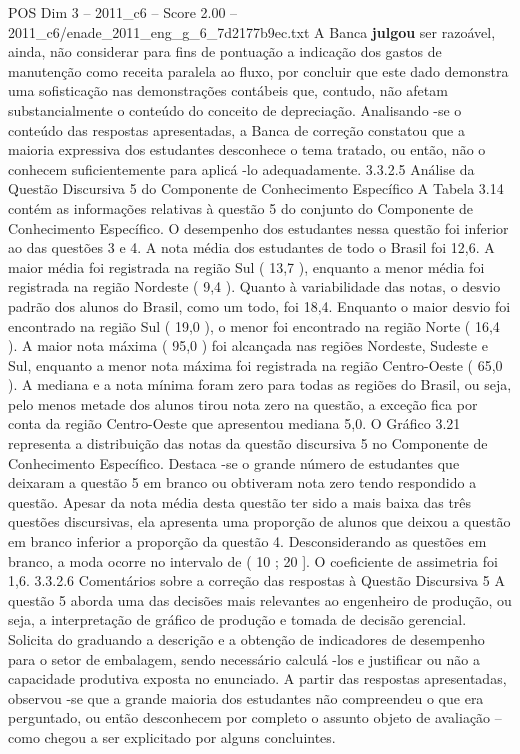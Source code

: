 \begin{textsample}{POS Dim 3 – 2011\_c6 – Score 2.00 – 2011\_c6/enade\_2011\_eng\_g\_6\_7d2177b9ec.txt}
A Banca \textbf{julgou} ser razoável, ainda, não considerar para fins de pontuação a indicação dos gastos de manutenção como receita paralela ao fluxo, por concluir que este dado demonstra uma sofisticação nas demonstrações contábeis que, contudo, não afetam substancialmente o conteúdo do conceito de depreciação.
Analisando -se o conteúdo das respostas apresentadas, a Banca de correção constatou que a maioria expressiva dos estudantes desconhece o tema tratado, ou então, não o conhecem suficientemente para aplicá -lo adequadamente. 3.3.2.5 Análise da Questão Discursiva 5 do Componente de Conhecimento Específico A Tabela 3.14 contém as informações relativas à questão 5 do conjunto do Componente de Conhecimento Específico.
O desempenho dos estudantes nessa questão foi inferior ao das questões 3 e 4.
A nota média dos estudantes de todo o Brasil foi 12,6.
A maior média foi registrada na região Sul ( 13,7 ), enquanto a menor média foi registrada na região Nordeste ( 9,4 ).
Quanto à variabilidade das notas, o desvio padrão dos alunos do Brasil, como um todo, foi 18,4.
Enquanto o maior desvio foi encontrado na região Sul ( 19,0 ), o menor foi encontrado na região Norte ( 16,4 ).
A maior nota máxima ( 95,0 ) foi alcançada nas regiões Nordeste, Sudeste e Sul, enquanto a menor nota máxima foi registrada na região Centro-Oeste ( 65,0 ).
A mediana e a nota mínima foram zero para todas as regiões do Brasil, ou seja, pelo menos metade dos alunos tirou nota zero na questão, a exceção fica por conta da região Centro-Oeste que apresentou mediana 5,0.
O Gráfico 3.21 representa a distribuição das notas da questão discursiva 5 no Componente de Conhecimento Específico.
Destaca -se o grande número de estudantes que deixaram a questão 5 em branco ou obtiveram nota zero tendo respondido a questão.
Apesar da nota média desta questão ter sido a mais baixa das três questões discursivas, ela apresenta uma proporção de alunos que deixou a questão em branco inferior a proporção da questão 4.
Desconsiderando as questões em branco, a moda ocorre no intervalo de ( 10 ; 20 ].
O coeficiente de assimetria foi 1,6. 3.3.2.6 Comentários sobre a correção das respostas à Questão Discursiva 5 A questão 5 aborda uma das decisões mais relevantes ao engenheiro de produção, ou seja, a interpretação de gráfico de produção e tomada de decisão gerencial.
Solicita do graduando a descrição e a obtenção de indicadores de desempenho para o setor de embalagem, sendo necessário calculá -los e justificar ou não a capacidade produtiva exposta no enunciado.
A partir das respostas apresentadas, observou -se que a grande maioria dos estudantes não compreendeu o que era perguntado, ou então desconhecem por completo o assunto objeto de avaliação – como chegou a ser explicitado por alguns concluintes.

\end{textsample}
